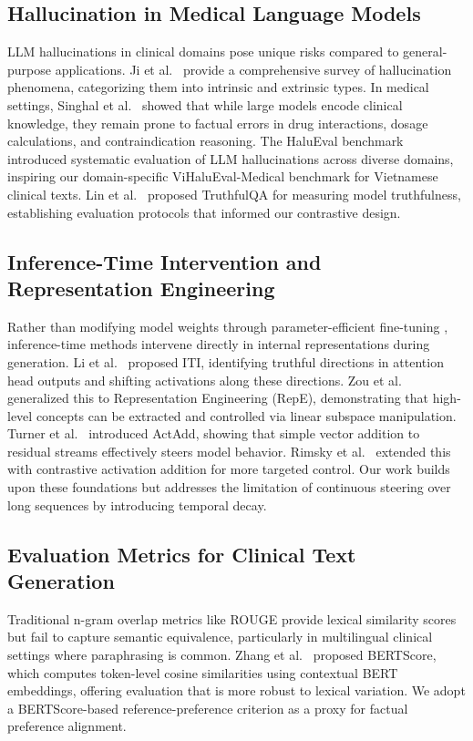 \subsection{Hallucination in Medical Language Models}
LLM hallucinations in clinical domains pose unique risks compared to general-purpose applications. Ji et al.~\cite{ref7} provide a comprehensive survey of hallucination phenomena, categorizing them into intrinsic and extrinsic types. In medical settings, Singhal et al.~\cite{ref3} showed that while large models encode clinical knowledge, they remain prone to factual errors in drug interactions, dosage calculations, and contraindication reasoning. The HaluEval benchmark \cite{ref13} introduced systematic evaluation of LLM hallucinations across diverse domains, inspiring our domain-specific ViHaluEval-Medical benchmark for Vietnamese clinical texts. Lin et al.~\cite{ref16} proposed TruthfulQA for measuring model truthfulness, establishing evaluation protocols that informed our contrastive design.

\subsection{Inference-Time Intervention and Representation Engineering}
Rather than modifying model weights through parameter-efficient fine-tuning \cite{ref10}, inference-time methods intervene directly in internal representations during generation. Li et al.~\cite{ref2} proposed ITI, identifying truthful directions in attention head outputs and shifting activations along these directions. Zou et al.~\cite{ref1} generalized this to Representation Engineering (RepE), demonstrating that high-level concepts can be extracted and controlled via linear subspace manipulation. Turner et al.~\cite{ref8} introduced ActAdd, showing that simple vector addition to residual streams effectively steers model behavior. Rimsky et al.~\cite{ref9} extended this with contrastive activation addition for more targeted control. Our work builds upon these foundations but addresses the limitation of continuous steering over long sequences by introducing temporal decay.

\subsection{Evaluation Metrics for Clinical Text Generation}
Traditional n-gram overlap metrics like ROUGE \cite{ref14} provide lexical similarity scores but fail to capture semantic equivalence, particularly in multilingual clinical settings where paraphrasing is common. Zhang et al.~\cite{ref15} proposed BERTScore, which computes token-level cosine similarities using contextual BERT embeddings, offering evaluation that is more robust to lexical variation. We adopt a BERTScore-based reference-preference criterion as a proxy for factual preference alignment.

